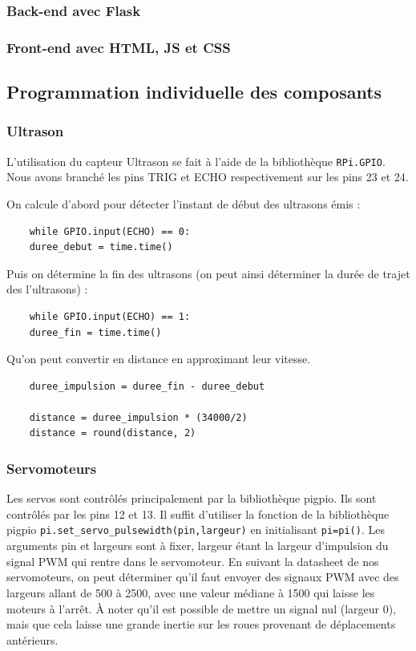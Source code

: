 \documentclass[a4paper,12pt]{report}  %
\begin{document}
\subsubsection{Back-end avec Flask}


\subsubsection{Front-end avec HTML, JS et CSS}

\subsection{Programmation individuelle des composants}

\subsubsection{Ultrason}

L’utilisation du capteur Ultrason se fait à l’aide de la bibliothèque \texttt{RPi.GPIO}.
Nous avons branché les pins TRIG et ECHO respectivement sur les pins 23 et 24.

On calcule d’abord pour détecter l’instant de début des ultrasons émis :
\begin{lstlisting}
	while GPIO.input(ECHO) == 0:   
	duree_debut = time.time()
\end{lstlisting}

Puis on détermine la fin des ultrasons (on peut ainsi déterminer la durée de trajet des l’ultrasons) :
\begin{lstlisting}
	while GPIO.input(ECHO) == 1:
	duree_fin = time.time()
\end{lstlisting}

Qu’on peut convertir en distance en approximant leur vitesse.

\begin{lstlisting}
	duree_impulsion = duree_fin - duree_debut
	
	distance = duree_impulsion * (34000/2)
	distance = round(distance, 2)
\end{lstlisting}

\subsubsection{Servomoteurs}

Les servos sont contrôlés principalement par la bibliothèque pigpio.  
Ils sont contrôlés par les pins 12 et 13. Il suffit d’utiliser la fonction de la bibliothèque pigpio \texttt{pi.set\_servo\_pulsewidth(pin,largeur)} en initialisant \texttt{pi=pi()}. Les arguments pin et largeurs sont à fixer, largeur étant la largeur d’impulsion du signal PWM qui rentre dans le servomoteur. En suivant la datasheet de nos servomoteurs, on peut déterminer qu’il faut envoyer des signaux PWM avec des largeurs allant de 500 à 2500, avec une valeur médiane à 1500 qui laisse les moteurs à l’arrêt.
À noter qu’il est possible de mettre un signal nul (largeur 0), mais que cela laisse une grande inertie sur les roues provenant de déplacements antérieurs. 
\end{document}
